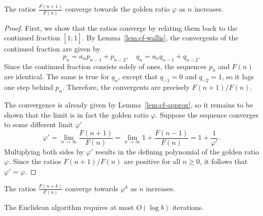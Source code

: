 \iffalse
\begin{example}
  Consider $a = 13$ and $b = 8$.
  The algorithm proceeds as follows:
  \[
    \begin{array}{rclcrcl}
      13/8 & = & 1 & · & 5/8 & + & 3/8 \\
       5/8 & = & 1 & · & 3/8 & + & 2/8 \\
       3/8 & = & 1 & · & 2/8 & + & 1/8 \\
       2/8 & = & 2 & · & 1/8 & + & 0.
    \end{array}
  \]
\end{example}
\fi

\begin{lemma}
  The ratios $\frac{F(n+1)}{F(n)}$ converge towards the golden ratio $φ$ as $n$ increases.
\end{lemma}

\begin{proof}
  First, we show that the ratios converge by relating them back to the
  continued fraction $[1; \overline{1}]$.
  By Lemma~\ref{lem:cf-wallis}, the convergents of the continued fraction are
  given by
  \[
    p_n = a_n p_{n-1} + p_{n-2}, \quad
    q_n = a_n q_{n-1} + q_{n-2}.
  \]
  Since the continued fraction consists solely of ones,
  the sequences $p_n$ and $F(n)$ are identical.
  The same is true for $q_n$, except that $q_{-1} = 0$ and $q_{-2} = 1$,
  so it lags one step behind $p_n$.
  Therefore, the convergents are precisely $F(n+1)/F(n)$.

  The convergence is already given by Lemma~\vref{lem:cf-approx},
  so it remains to be shown that the limit is in fact the golden ratio $φ$.
  Suppose the sequence converges to some different limit $φ'$
  \[
    φ' = \lim_{n → ∞} \frac{F(n+1)}{F(n)} = \lim_{n → ∞} 1 + \frac{F(n-1)}{F(n)} = 1 + \frac{1}{φ'}.
  \]
  Multiplying both sides by $φ'$ results in the defining polynomial of the golden ratio $φ$.
  Since the ratios $F(n+1)/F(n)$ are positive for all $n ≥ 0$, it follows that $φ' = φ$.
\end{proof}

\begin{corollary}
  \label{cor:fib-conv}
  The ratios $\frac{F(n+k)}{F(n)}$ converge towards $φ^k$ as $n$ increases.
\end{corollary}

\begin{theorem}
  The Euclidean algorithm requires at most $O(\log b)$ iterations.
\end{theorem}

